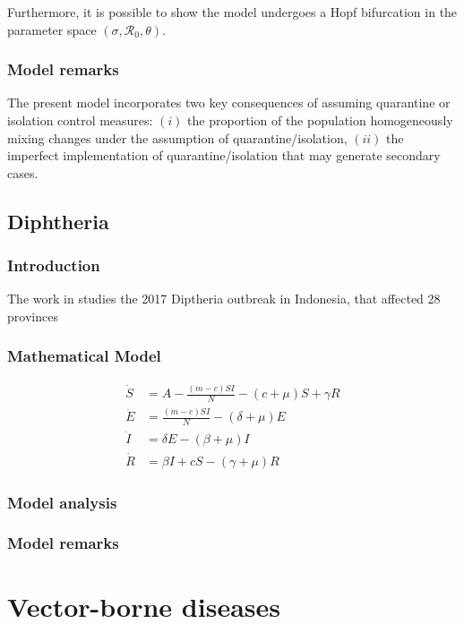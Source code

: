 \documentclass{book}
\begin{document}
Furthermore, it is possible to show the model undergoes a Hopf bifurcation in the parameter space $(\sigma,\mathcal{R}_0,\theta)$.

\subsection*{Model remarks}
The present model incorporates two key consequences of assuming quarantine or isolation control measures: $(i)$ the proportion of the population homogeneously mixing changes under the assumption of quarantine/isolation, $(ii)$ the imperfect implementation of quarantine/isolation that may generate secondary cases.


\section{Diphtheria}

\subsection*{Introduction}
The work in \cite{ilahi2018effectiveness} studies the 2017 Diptheria outbreak in Indonesia, that affected 28 provinces

\subsection*{Mathematical Model}

\begin{align}
\dot{S}&=A-\frac{(m-c) S I}{N}-(c+\mu) S+\gamma R \\
\dot{E}&=\frac{(m-c) S I}{N}-(\delta+\mu) E \\
\dot{I}&=\delta E-(\beta+\mu) I \\
\dot{R}&=\beta I+c S-(\gamma+\mu) R
\end{align}

\subsection*{Model analysis}
\subsection*{Model remarks}


\chapter{Vector-borne diseases}
\label{chapt:vectorborne}
\end{document}

